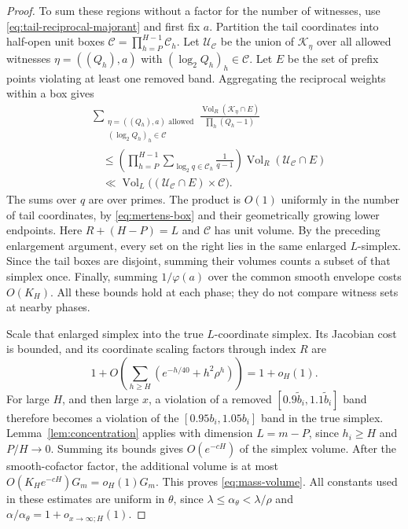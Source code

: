 \begin{proof}
To sum these regions without a factor for the number of witnesses,
use \eqref{eq:tail-reciprocal-majorant} and first fix $a$. Partition
the tail coordinates into half-open unit boxes
$\mathcal C=\prod_{h=P}^{H-1}\mathcal C_h$. Let
$\mathcal U_{\mathcal C}$ be the union of $\mathcal K_\eta$ over
all allowed witnesses $\eta=((Q_h),a)$ with $(\log_2Q_h)_h\in\mathcal C$.
Let $E$ be the set of prefix points violating at least one removed
band. Aggregating the reciprocal weights within a box gives
\begin{align*}
 &\sum_{\substack{\eta=((Q_h),a)\text{ allowed}\\
                   (\log_2Q_h)_h\in\mathcal C}}
 \frac{\operatorname{Vol}_R(\mathcal K_\eta\cap E)}
      {\prod_h(Q_h-1)}\\
 &\quad\le
 \left(\prod_{h=P}^{H-1}
       \sum_{\log_2q\in\mathcal C_h}\frac1{q-1}\right)
       \operatorname{Vol}_R(\mathcal U_{\mathcal C}\cap E)\\
 &\quad\ll\operatorname{Vol}_L
       \bigl((\mathcal U_{\mathcal C}\cap E)\times\mathcal C\bigr).
\end{align*}
The sums over $q$ are over primes. The product is $O(1)$ uniformly
in the number of tail coordinates, by \eqref{eq:mertens-box} and
their geometrically growing lower endpoints. Here $R+(H-P)=L$
and $\mathcal C$ has unit volume.
By the preceding enlargement argument, every set on the right lies
in the same enlarged $L$-simplex. Since the tail boxes are disjoint,
summing their volumes counts a subset of that simplex once. Finally,
summing $1/\varphi(a)$ over the common smooth envelope costs $O(K_H)$.
All these bounds hold at each phase; they do not compare witness sets
at nearby phases.

Scale that enlarged simplex into the true $L$-coordinate simplex.
Its Jacobian cost is bounded, and its coordinate scaling factors
through index $R$ are
\[
 1+O\!\left(\sum_{h\ge H}
       (e^{-h/40}+h^2\rho^h)\right)=1+o_H(1).
\]
For large $H$, and then large $x$, a violation of a removed
$[0.9\widetilde b_i,1.1\widetilde b_i]$ band therefore becomes a
violation of the
$[0.95b_i,1.05b_i]$ band in the true simplex.  Lemma~\ref{lem:concentration}
applies with dimension $L=m-P$, since $h_i\ge H$ and $P/H\to0$.
Summing its bounds gives $O(e^{-cH})$ of the simplex volume.
After the smooth-cofactor factor, the additional volume is at most
$O(K_He^{-cH})G_m=o_H(1)G_m$.
This proves \eqref{eq:mass-volume}.  All constants used in these
estimates are uniform in $\theta$, since
$\lambda\le\alpha_\theta<\lambda/\rho$ and
$\alpha/\alpha_\theta=1+o_{x\to\infty;H}(1)$.

\end{proof}

